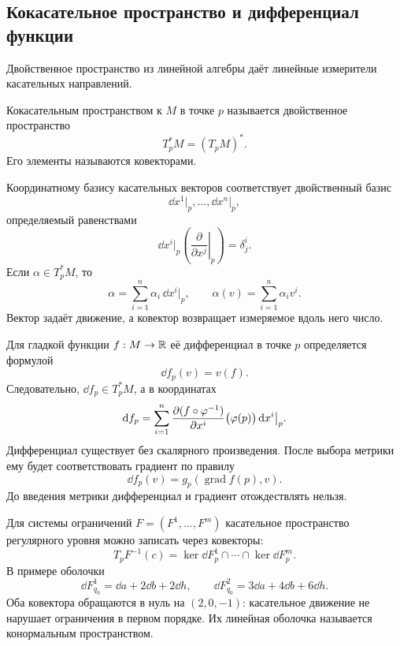 \subsection{Кокасательное пространство и дифференциал функции}

Двойственное пространство из линейной алгебры даёт линейные измерители касательных направлений.

\begin{definition}
Кокасательным пространством к \(M\) в точке \(p\) называется двойственное пространство
\begin{equation}
\label{eq:cotangent-space-definition}
T_p^*M=(T_pM)^*.
\end{equation}
Его элементы называются ковекторами.
\end{definition}

Координатному базису касательных векторов соответствует двойственный базис
\[
\dd x^1\big|_p,\ldots,\dd x^n\big|_p,
\]
определяемый равенствами
\begin{equation}
\label{eq:cotangent-dual-basis}
\dd x^i\big|_p
\left(
\left.\frac{\partial}{\partial x^j}\right|_p
\right)
=\delta^i_j.
\end{equation}
Если \(\alpha\in T_p^*M\), то
\[
\alpha
=
\sum_{i=1}^n\alpha_i\,\dd x^i\big|_p,
\qquad
\alpha(v)=\sum_{i=1}^n\alpha_i v^i.
\]
Вектор задаёт движение, а ковектор возвращает измеряемое вдоль него число.

Для гладкой функции \(f:M\to\mathbb{R}\) её дифференциал в точке \(p\) определяется формулой
\begin{equation}
\label{eq:function-differential-on-manifold}
\dd f_p(v)=v(f).
\end{equation}
Следовательно, \(\dd f_p\in T_p^*M\), а в координатах
\begin{equation}
\label{eq:function-differential-coordinates}
\mathop{}\!\mathrm{d} f_p
=
\sum_{i=1}^n
\frac{\partial (f\circ\varphi^{-1})}{\partial x^i}\bigl(\varphi(p)\bigr)
\mathop{}\!\mathrm{d} x^i\big|_p.
\end{equation}
Дифференциал существует без скалярного произведения. После выбора метрики ему будет соответствовать градиент по правилу
\[
\dd f_p(v)=g_p(\operatorname{grad}f(p),v).
\]
До введения метрики дифференциал и градиент отождествлять нельзя.

Для системы ограничений \(F=(F^1,\ldots,F^m)\) касательное пространство регулярного уровня можно записать через ковекторы:
\begin{equation}
\label{eq:tangent-space-annihilated-by-constraints}
T_pF^{-1}(c)
=
\ker\dd F^1_p\cap\cdots\cap\ker\dd F^m_p.
\end{equation}
В примере оболочки
\[
\dd F^1_{q_0}=\dd a+2\dd b+2\dd h,
\qquad
\dd F^2_{q_0}=3\dd a+4\dd b+6\dd h.
\]
Оба ковектора обращаются в нуль на \((2,0,-1)\): касательное движение не нарушает ограничения в первом порядке. Их линейная оболочка называется конормальным пространством.

